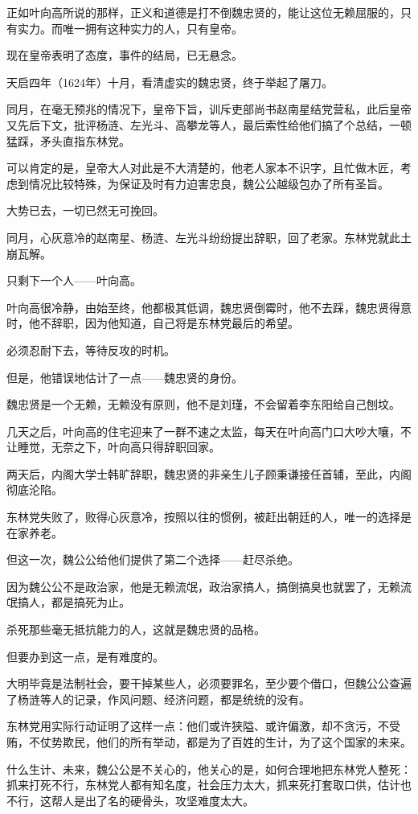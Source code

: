 \begin{multicols}{\theparacolNo}
正如叶向高所说的那样，正义和道德是打不倒魏忠贤的，能让这位无赖屈服的，只有实力。而唯一拥有这种实力的人，只有皇帝。

现在皇帝表明了态度，事件的结局，已无悬念。

天启四年（1624年）十月，看清虚实的魏忠贤，终于举起了屠刀。

同月，在毫无预兆的情况下，皇帝下旨，训斥吏部尚书赵南星结党营私，此后皇帝又先后下文，批评杨涟、左光斗、高攀龙等人，最后索性给他们搞了个总结，一顿猛踩，矛头直指东林党。

可以肯定的是，皇帝大人对此是不大清楚的，他老人家本不识字，且忙做木匠，考虑到情况比较特殊，为保证及时有力迫害忠良，魏公公越级包办了所有圣旨。

大势已去，一切已然无可挽回。

同月，心灰意冷的赵南星、杨涟、左光斗纷纷提出辞职，回了老家。东林党就此土崩瓦解。

只剩下一个人——叶向高。

叶向高很冷静，由始至终，他都极其低调，魏忠贤倒霉时，他不去踩，魏忠贤得意时，他不辞职，因为他知道，自己将是东林党最后的希望。

必须忍耐下去，等待反攻的时机。

但是，他错误地估计了一点——魏忠贤的身份。

魏忠贤是一个无赖，无赖没有原则，他不是刘瑾，不会留着李东阳给自己刨坟。

几天之后，叶向高的住宅迎来了一群不速之太监，每天在叶向高门口大吵大嚷，不让睡觉，无奈之下，叶向高只得辞职回家。

两天后，内阁大学士韩旷辞职，魏忠贤的非亲生儿子顾秉谦接任首辅，至此，内阁彻底沦陷。

东林党失败了，败得心灰意冷，按照以往的惯例，被赶出朝廷的人，唯一的选择是在家养老。

但这一次，魏公公给他们提供了第二个选择——赶尽杀绝。

因为魏公公不是政治家，他是无赖流氓，政治家搞人，搞倒搞臭也就罢了，无赖流氓搞人，都是搞死为止。

杀死那些毫无抵抗能力的人，这就是魏忠贤的品格。

但要办到这一点，是有难度的。

大明毕竟是法制社会，要干掉某些人，必须要罪名，至少要个借口，但魏公公查遍了杨涟等人的记录，作风问题、经济问题，都是统统的没有。

东林党用实际行动证明了这样一点：他们或许狭隘、或许偏激，却不贪污，不受贿，不仗势欺民，他们的所有举动，都是为了百姓的生计，为了这个国家的未来。

什么生计、未来，魏公公是不关心的，他关心的是，如何合理地把东林党人整死：抓来打死不行，东林党人都有知名度，社会压力太大，抓来死打套取口供，估计也不行，这帮人是出了名的硬骨头，攻坚难度太大。


\end{multicols}
